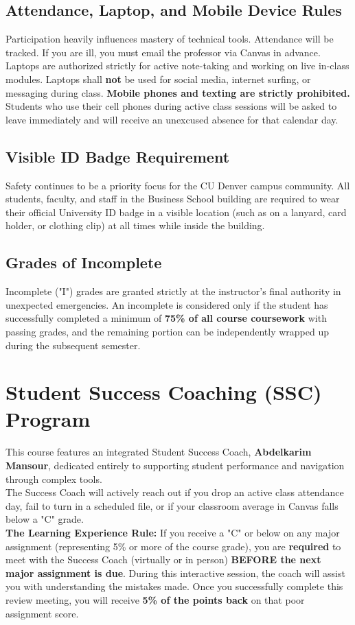\documentclass[11pt,a4paper]{article}
\begin{document}
\subsection*{Attendance, Laptop, and Mobile Device Rules}
Participation heavily influences mastery of technical tools. Attendance will be tracked. If you are ill, you must email the professor via Canvas in advance.
\\
Laptops are authorized strictly for active note-taking and working on live in-class modules. Laptops shall \textbf{not} be used for social media, internet surfing, or messaging during class. \textbf{Mobile phones and texting are strictly prohibited.} Students who use their cell phones during active class sessions will be asked to leave immediately and will receive an unexcused absence for that calendar day.

\subsection*{Visible ID Badge Requirement}
Safety continues to be a priority focus for the CU Denver campus community. All students, faculty, and staff in the Business School building are required to wear their official University ID badge in a visible location (such as on a lanyard, card holder, or clothing clip) at all times while inside the building.

\subsection*{Grades of Incomplete}
Incomplete ("I") grades are granted strictly at the instructor's final authority in unexpected emergencies. An incomplete is considered only if the student has successfully completed a minimum of \textbf{75\% of all course coursework} with passing grades, and the remaining portion can be independently wrapped up during the subsequent semester.

\section*{Student Success Coaching (SSC) Program}
This course features an integrated Student Success Coach, \textbf{Abdelkarim Mansour}, dedicated entirely to supporting student performance and navigation through complex tools. 
\\
The Success Coach will actively reach out if you drop an active class attendance day, fail to turn in a scheduled file, or if your classroom average in Canvas falls below a "C" grade. 
\\
\textbf{The Learning Experience Rule:} If you receive a "C" or below on any major assignment (representing 5\% or more of the course grade), you are \textbf{required} to meet with the Success Coach (virtually or in person) \textbf{BEFORE the next major assignment is due}. During this interactive session, the coach will assist you with understanding the mistakes made. Once you successfully complete this review meeting, you will receive \textbf{5\% of the points back} on that poor assignment score.
\end{document}
